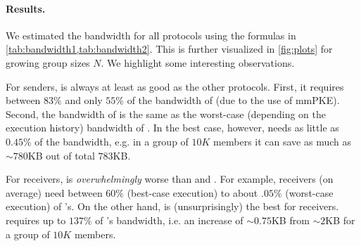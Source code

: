 \paragraph{Results.}
We estimated the bandwidth for all protocols using the formulas in \cref{tab:bandwidth1,tab:bandwidth2}. This is further
visualized in \cref{fig:plots} for growing group sizes $N$.
%
%
We highlight some interesting observations. %

For senders, \saik is always at least as good as the other protocols. First, it requires between $83\%$ and only $55\%$ of the bandwidth of \protITK (due to the use of mmPKE). Second, the bandwidth of \protCMPKE is the same as the worst-case (depending on the execution history) bandwidth of \saik. In the best case, however, \saik needs as little as $0.45\%$ of the bandwidth, e.g. in a
group of $10K$ members it can save as much as $\sim 780$KB out of total
$783$KB.





For receivers, \protITK is \emph{overwhelmingly} worse than \saik and \protCMPKE. For
example, \saik receivers (on average) need between $60\%$ (best-case execution) to about $.05\%$ (worst-case execution) of \protITK's. On the other hand, \protCMPKE is (unsurprisingly) the best for receivers.  \saik requires up to $137\%$ of \protCMPKE's bandwidth, i.e. an
increase of $\sim 0.75$KB from $\sim 2$KB for a group of $10K$ members.


